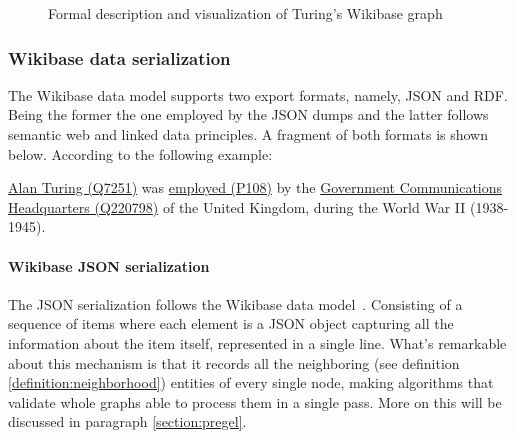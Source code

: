 \vspace*{-1.25em}



\begin{figure}[H]
    \centering
    
    \caption[Formal description and visualization of Turing's Wikibase graph]{Formal description and visualization of Turing's Wikibase graph}
\end{figure}

\subsubsection{Wikibase data serialization}
\label{section:wikibase:serialization}

The Wikibase data model supports two export formats, namely, JSON and RDF. Being the former the one employed by the JSON dumps and the latter follows semantic web and linked data principles. A fragment of both formats is shown below. According to the following example:

\begin{example}
    \href{https://www.wikidata.org/wiki/Q7251}{Alan Turing (Q7251)} was \href{https://www.wikidata.org/wiki/Property:P108}{employed (P108)} by the \href{https://www.wikidata.org/wiki/Q220798}{Government Communications Headquarters (Q220798)} of the United Kingdom, during the World War II (1938-1945).
\end{example}

\paragraph{Wikibase JSON serialization}

The JSON serialization follows the Wikibase data model~\cite{https://doi.org/10.48550/arxiv.2110.11709}. Consisting of a sequence of items where each element is a JSON object capturing all the information about the item itself, represented in a single line. What's remarkable about this mechanism is that it records all the neighboring (see definition \ref{definition:neighborhood}) entities of every single node, making algorithms that validate whole graphs able to process them in a single pass. More on this will be discussed in paragraph \ref{section:pregel}.

\begin{dumps}
    \inputminted{json}{code/listings/6-1_serialization.json}
\end{dumps}


